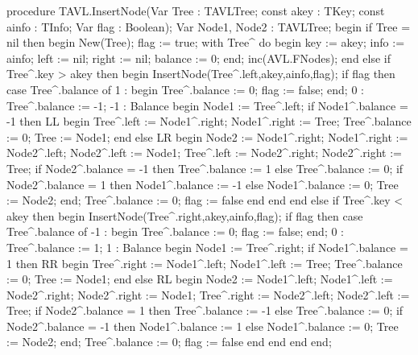 \begin{}
procedure TAVL.InsertNode(Var Tree : TAVLTree; const akey : TKey; const ainfo : TInfo; Var flag : Boolean);
 Var
 Node1, Node2 : TAVLTree;
 begin
 if Tree = nil then
  begin
    New(Tree);
    flag := true;
    with Tree^ do
      begin
        key := akey;
        info := ainfo;
        left := nil;
        right := nil;
        balance := 0;
      end;
    inc(AVL.FNodes);
  end
 else if Tree^.key > akey then
  begin
    InsertNode(Tree^.left,akey,ainfo,flag);
    if flag then
      case Tree^.balance of
      1 : begin Tree^.balance := 0; flag := false; end;
      0 : Tree^.balance := -1;
      -1 :   { Balance }
        begin
         Node1 := Tree^.left;
         if Node1^.balance = -1 then
          { LL }
            begin
              Tree^.left := Node1^.right;
              Node1^.right := Tree;
              Tree^.balance := 0;
              Tree := Node1;
            end
         else
            {LR}
            begin
              Node2 := Node1^.right;
              Node1^.right :=  Node2^.left;
              Node2^.left := Node1;
              Tree^.left := Node2^.right;
              Node2^.right := Tree;
              if Node2^.balance = -1 then Tree^.balance := 1 else Tree^.balance := 0;
              if Node2^.balance = 1 then Node1^.balance := -1 else Node1^.balance := 0;
              Tree := Node2;
            end;
         Tree^.balance := 0;
         flag := false
        end
      end
  end
 else if Tree^.key < akey then
  begin
    InsertNode(Tree^.right,akey,ainfo,flag);
    if flag then
      case Tree^.balance of
      -1 : begin Tree^.balance := 0; flag := false; end;
      0 : Tree^.balance := 1;
      1 :   { Balance }
        begin
         Node1 := Tree^.right;
         if Node1^.balance = 1 then
          { RR }
            begin
              Tree^.right := Node1^.left;
              Node1^.left := Tree;
              Tree^.balance := 0;
              Tree := Node1;
            end
         else
            {RL}
            begin
              Node2 := Node1^.left;
              Node1^.left :=  Node2^.right;
              Node2^.right := Node1;
              Tree^.right := Node2^.left;
              Node2^.left := Tree;
              if Node2^.balance = 1 then Tree^.balance := -1 else Tree^.balance := 0;
              if Node2^.balance = -1 then Node1^.balance := 1 else Node1^.balance := 0;
              Tree := Node2;
            end;
         Tree^.balance := 0;
         flag := false
        end
      end
  end
 end;
\end{}